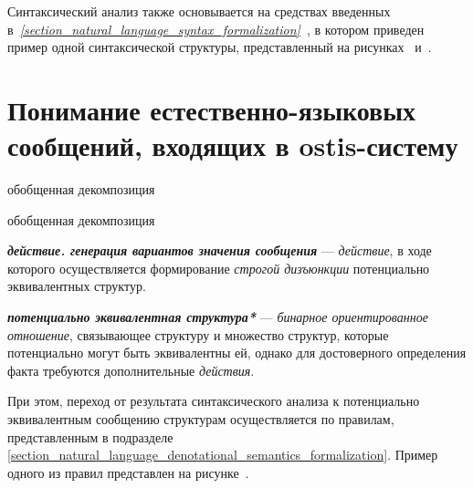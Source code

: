 Синтаксический анализ также основывается на средствах введенных в~\textit{\ref{section_natural_language_syntax_formalization}~}, в котором приведен пример одной синтаксической структуры, представленный на рисунках~\textit{} и~\textit{}.

\section{Понимание естественно-языковых сообщений, входящих в ostis-систему}
\label{section_natural_language_messages_understanding}

\begin{SCn}

    \begin{scnrelfromset}{обобщенная декомпозиция}
        \begin{scnindent}
            \begin{scnrelfromset}{обобщенная декомпозиция}
            \end{scnrelfromset}
        \end{scnindent}
    \end{scnrelfromset}

\end{SCn}

\textbf{\textit{действие. генерация вариантов значения сообщения}} --- \textit{действие}, в ходе которого осуществляется формирование \textit{строгой дизъюнкции} потенциально эквивалентных структур.

\textbf{\textit{потенциально эквивалентная структура*}} --- \textit{бинарное ориентированное отношение}, связывающее структуру и множество структур, которые потенциально могут быть эквивалентны ей, однако для достоверного определения факта требуются дополнительные \textit{действия}.

При этом, переход от результата синтаксического анализа к потенциально эквивалентным сообщению структурам осуществляется по правилам, представленным в подразделе \ref{section_natural_language_denotational_semantics_formalization}.
Пример одного из правил представлен на рисунке~\textit{}.

